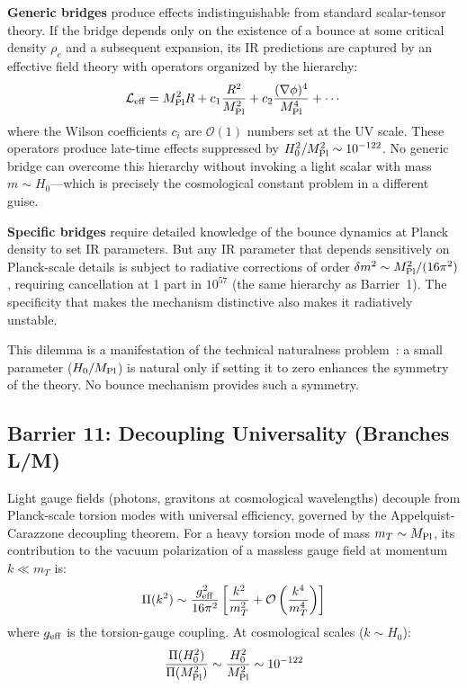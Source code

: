 \documentclass[a4paper,11pt]{article}
\newcommand{\Mpl}{M_{\rm Pl}}
\begin{document}
\textbf{Generic bridges} produce effects indistinguishable from standard scalar-tensor theory. If the bridge depends only on the existence of a bounce at some critical density $\rho_c$ and a subsequent expansion, its IR predictions are captured by an effective field theory with operators organized by the hierarchy:
\begin{equation}
\mathcal{L}_{\rm eff} = \Mpl^2 R + c_1 \frac{R^2}{\Mpl^2} + c_2 \frac{(\nabla\phi)^4}{\Mpl^4} + \cdots
\end{equation}
where the Wilson coefficients $c_i$ are $\mathcal{O}(1)$ numbers set at the UV scale. These operators produce late-time effects suppressed by $H_0^2/\Mpl^2 \sim 10^{-122}$. No generic bridge can overcome this hierarchy without invoking a light scalar with mass $m \sim H_0$---which is precisely the cosmological constant problem in a different guise.

\textbf{Specific bridges} require detailed knowledge of the bounce dynamics at Planck density to set IR parameters. But any IR parameter that depends sensitively on Planck-scale details is subject to radiative corrections of order $\delta m^2 \sim \Mpl^2/(16\pi^2)$, requiring cancellation at 1 part in $10^{57}$ (the same hierarchy as Barrier~1). The specificity that makes the mechanism distinctive also makes it radiatively unstable.

This dilemma is a manifestation of the technical naturalness problem~\citep{tHooft:1979nat}: a small parameter ($H_0/\Mpl$) is natural only if setting it to zero enhances the symmetry of the theory. No bounce mechanism provides such a symmetry.

\subsection{Barrier 11: Decoupling Universality (Branches L/M)}

Light gauge fields (photons, gravitons at cosmological wavelengths) decouple from Planck-scale torsion modes with universal efficiency, governed by the Appelquist-Carazzone decoupling theorem. For a heavy torsion mode of mass $m_T \sim \Mpl$, its contribution to the vacuum polarization of a massless gauge field at momentum $k \ll m_T$ is:
\begin{equation}
\Pi(k^2) \sim \frac{g_{\rm eff}^2}{16\pi^2}\left[\frac{k^2}{m_T^2} + \mathcal{O}\left(\frac{k^4}{m_T^4}\right)\right]
\end{equation}
where $g_{\rm eff}$ is the torsion-gauge coupling. At cosmological scales ($k \sim H_0$):
\begin{equation}
\frac{\Pi(H_0^2)}{\Pi(\Mpl^2)} \sim \frac{H_0^2}{\Mpl^2} \sim 10^{-122}
\end{equation}
\end{document}
